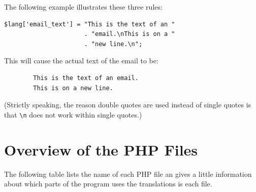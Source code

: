 \documentclass[11pt,oneside,a4paper]{memoir}
\begin{document}
The following example illustrates these three rules:

\begin{lstlisting}
$lang['email_text'] = "This is the text of an "
                      . "email.\nThis is on a "
                      . "new line.\n";
\end{lstlisting}

This will cause the actual text of the email to be:

\begin{verbatim}
        This is the text of an email.
        This is on a new line.
\end{verbatim}

(Strictly speaking, the reason double quotes are used instead of single quotes is that \verb|\n| does not work
within single quotes.)

\section{Overview of the PHP Files}

The following table lists the name of each PHP file an gives a little information about which parts
of the program uses the translations is each file.
\end{document}
